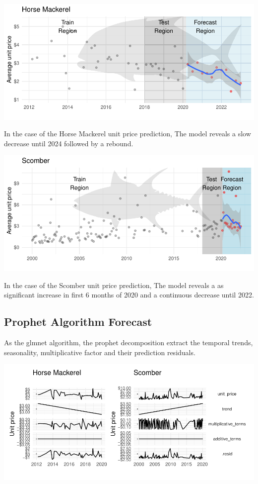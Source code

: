 \documentclass[10,a4paperpaper,]{article}
\begin{document}
\includegraphics{report_files/figure-latex/unnamed-chunk-17-1.pdf}

In the case of the Horse Mackerel unit price prediction, The model
reveals a slow decrease until 2024 followed by a rebound.

\includegraphics{report_files/figure-latex/unnamed-chunk-18-1.pdf}

In the case of the Scomber unit price prediction, The model reveals a as
significant increase in first 6 months of 2020 and a continuous decrease
until 2022.

\subsection{Prophet Algorithm Forecast}

As the glmnet algorithm, the prophet decomposition extract the temporal
trends, seasonality, multiplicative factor and their prediction
residuals.

\includegraphics{report_files/figure-latex/unnamed-chunk-19-1.pdf}
\end{document}
